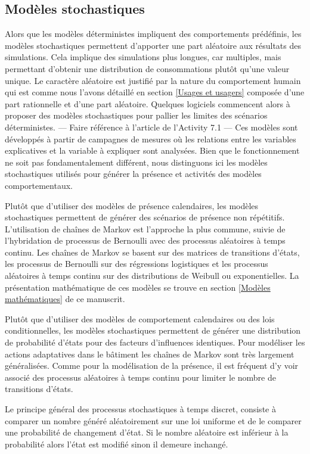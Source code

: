\subsection{Modèles stochastiques}

Alors que les modèles déterministes impliquent des comportements prédéfinis, les modèles stochastiques permettent d'apporter une part aléatoire aux résultats des simulations. Cela implique des simulations plus longues, car multiples, mais permettant d'obtenir une distribution de consommations plutôt qu'une valeur unique. Le caractère aléatoire est justifié par la nature du comportement humain qui est comme nous l'avons détaillé en section \ref{Usages et usagers} composée d'une part rationnelle et d'une part aléatoire. Quelques logiciels commencent alors à proposer des modèles stochastiques pour pallier les limites des scénarios déterministes. --- Faire référence à l'article de l'Activity 7.1 --- Ces modèles sont développés à partir de campagnes de mesures où les relations entre les variables explicatives et la variable à expliquer sont analysées. Bien que le fonctionnement ne soit pas fondamentalement différent, nous distinguons ici les modèles stochastiques utilisés pour générer la présence et activités des modèles comportementaux.

Plutôt que d'utiliser des modèles de présence calendaires, les modèles stochastiques permettent de générer des scénarios de présence non répétitifs. L'utilisation de chaînes de Markov est l'approche la plus commune, suivie de l'hybridation de processus de Bernoulli avec des processus aléatoires à temps continu. Les chaînes de Markov se basent sur des matrices de transitions d'états, les processus de Bernoulli sur des régressions logistiques et les processus aléatoires à temps continu sur des distributions de Weibull ou exponentielles. La présentation mathématique de ces modèles se trouve en section \ref{Modèles mathématiques} de ce manuscrit.

Plutôt que d'utiliser des modèles de comportement calendaires ou des lois conditionnelles, les modèles stochastiques permettent de générer une distribution de probabilité d'états pour des facteurs d'influences identiques. Pour modéliser les actions adaptatives dans le bâtiment les chaînes de Markov sont très largement généralisées. Comme pour la modélisation de la présence, il est fréquent d'y voir associé des processus aléatoires à temps continu pour limiter le nombre de transitions d'états.

Le principe général des processus stochastiques à temps discret, consiste à comparer un nombre généré aléatoirement sur une loi uniforme et de le comparer une probabilité de changement d'état. Si le nombre aléatoire est inférieur à la probabilité alors l'état est modifié sinon il demeure inchangé. 

